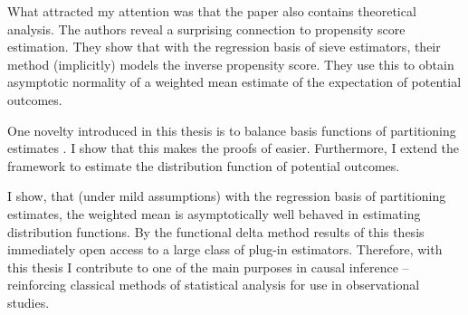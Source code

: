What attracted my attention was that
the paper \cite{Wang2019} also contains theoretical analysis.
The authors reveal a surprising connection to propensity score estimation.
They show that with the regression basis of sieve estimators\cite{Newey1997a}, their method (implicitly) models the inverse propensity score.
They use this to obtain asymptotic normality of a weighted mean estimate of the expectation of potential outcomes.

One novelty introduced in this thesis is to balance basis functions of partitioning estimates \cite{Gyorfi2002}.
I show that this makes the proofs of \cite{Wang2019} easier.
Furthermore, I extend the framework to estimate the distribution function of potential outcomes.

I show, that (under mild assumptions) with the regression basis of partitioning estimates, the weighted mean is asymptotically well behaved in estimating distribution functions.
By the functional delta method
\cite[§20]{Vaart2000} results of this thesis immediately open access to a large class of plug-in estimators.
Therefore,
with this thesis I contribute to one of the main purposes in causal inference -- reinforcing classical methods of statistical analysis for use in observational studies.



